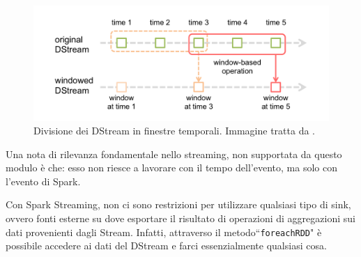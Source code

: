 \documentclass[12pt,italian]{article}
\begin{document}
\begin{figure}
	\centering 
	\includegraphics[width=0.8\linewidth]{img/sparkStreamingWindow.png}
	\caption{Divisione dei DStream in finestre temporali. Immagine tratta da \cite{spark}.}
	\label{fig:SparkStreamingWindow}
\end{figure}
\par Una nota di rilevanza fondamentale nello streaming, non supportata da questo modulo è che: esso non riesce a lavorare con il tempo dell'evento, ma solo con l'evento di Spark.

\par Con Spark Streaming, non ci sono restrizioni per utilizzare qualsiasi tipo di sink, ovvero fonti esterne su dove esportare il risultato di operazioni di aggregazioni sui dati provenienti dagli Stream. Infatti, attraverso il metodo``\texttt{foreachRDD}" è possibile accedere ai dati del DStream e farci essenzialmente qualsiasi cosa. 
\end{document}
